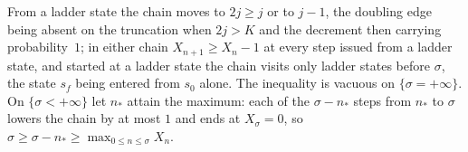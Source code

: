 From a ladder state the chain moves to $2j\geq j$ or to $j-1$, the doubling edge being
absent on the truncation when $2j>K$ and the decrement then carrying probability~$1$; in
either chain $X_{n+1}\geq X_n-1$ at every step issued from a ladder state, and started at a
ladder state the chain visits only ladder states before $\sigma$, the state $s_f$ being
entered from $s_0$ alone. The inequality is vacuous on $\{\sigma=+\infty\}$. On
$\{\sigma<+\infty\}$ let $n_*$ attain the maximum: each of the $\sigma-n_*$ steps from $n_*$
to $\sigma$ lowers the chain by at most $1$ and ends at $X_\sigma=0$, so
$\sigma\geq\sigma-n_*\geq\max_{0\leq n\leq\sigma}X_n$.

